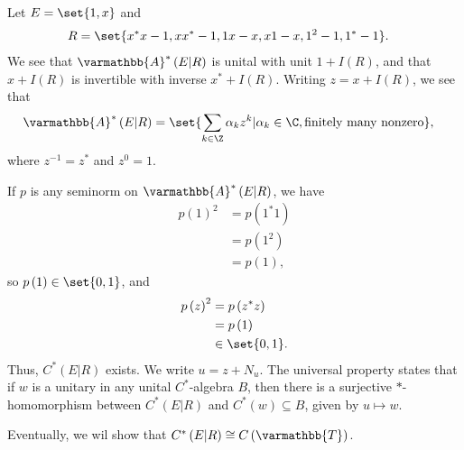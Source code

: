 \documentclass[10pt]{mypackage}
\renewcommand*{\mathbb}[1]{\varmathbb{#1}}
\newcommand{\A}{\mathbb{A}}
\newcommand{\T}{\mathbb{T}}
\begin{document}
\begin{example}
  Let $E = \set{1,x}$ and
  \begin{align*}
    R &= \set{x^{\ast}x - 1,xx^{\ast}-1,1x-x,x1-x,1^2-1,1^{\ast}-1}.
  \end{align*}
  We see that $\A^{\ast}\left(E|R\right)$ is unital with unit $1 + I(R)$, and that $x+I(R)$ is invertible with inverse $x^{\ast} + I(R)$. Writing $z = x + I(R)$, we see that
  \begin{align*}
    \A^{\ast}\left(E|R\right) &= \set{\sum_{k\in \Z}\alpha_kz^k | \alpha_k\in \C,\text{finitely many nonzero}},
  \end{align*}
  where $z^{-1} = z^{\ast}$ and $z^0 = 1$.\newline

  If $p$ is any seminorm on $\A^{\ast}\left(E|R\right)$, we have
  \begin{align*}
    p\left(1\right)^2 &= p\left(1^{\ast}1\right)\\
                      &= p\left(1^2\right)\\
                      &= p\left(1\right),
  \end{align*}
  so $p\left(1\right) \in \set{0,1}$, and
  \begin{align*}
    p\left(z\right)^2 &= p\left(z^{\ast}z\right)\\
                      &= p\left(1\right)\\
                      &\in \set{0,1}.
  \end{align*}
  Thus, $C^{\ast}\left(E|R\right)$ exists. We write $u = z + N_u$. The universal property states that if $w$ is a unitary in any unital $C^{\ast}$-algebra $B$, then there is a surjective $\ast$-homomorphism between $C^{\ast}\left(E|R\right)$ and $C^{\ast}\left(w\right)\subseteq B$, given by $u\mapsto w$.\newline

  Eventually, we wil show that $C^{\ast}\left(E|R\right)\cong C\left(\T\right)$.
\end{example}
\end{document}
